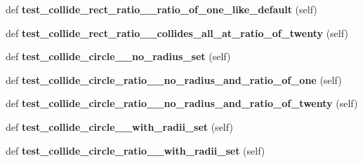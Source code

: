 \begin{DoxyCompactItemize}
\item 
\mbox{\label{classpygame_1_1tests_1_1sprite__test_1_1_sprite_collide_test_abd3014a6db0bb69077bf901b966a7a60}} 
def {\bfseries test\+\_\+collide\+\_\+rect\+\_\+ratio\+\_\+\+\_\+ratio\+\_\+of\+\_\+one\+\_\+like\+\_\+default} (self)
\item 
\mbox{\label{classpygame_1_1tests_1_1sprite__test_1_1_sprite_collide_test_ac09bd157f041a16ff2b6033f659a6550}} 
def {\bfseries test\+\_\+collide\+\_\+rect\+\_\+ratio\+\_\+\+\_\+collides\+\_\+all\+\_\+at\+\_\+ratio\+\_\+of\+\_\+twenty} (self)
\item 
\mbox{\label{classpygame_1_1tests_1_1sprite__test_1_1_sprite_collide_test_a13668e9f41bf73fc7fef0d5b630a4ba4}} 
def {\bfseries test\+\_\+collide\+\_\+circle\+\_\+\+\_\+no\+\_\+radius\+\_\+set} (self)
\item 
\mbox{\label{classpygame_1_1tests_1_1sprite__test_1_1_sprite_collide_test_ae5fd23e423cf103e81c51d75685401f9}} 
def {\bfseries test\+\_\+collide\+\_\+circle\+\_\+ratio\+\_\+\+\_\+no\+\_\+radius\+\_\+and\+\_\+ratio\+\_\+of\+\_\+one} (self)
\item 
\mbox{\label{classpygame_1_1tests_1_1sprite__test_1_1_sprite_collide_test_a4740c32a2b0a0bfcfbabb28485b70191}} 
def {\bfseries test\+\_\+collide\+\_\+circle\+\_\+ratio\+\_\+\+\_\+no\+\_\+radius\+\_\+and\+\_\+ratio\+\_\+of\+\_\+twenty} (self)
\item 
\mbox{\label{classpygame_1_1tests_1_1sprite__test_1_1_sprite_collide_test_af367ee97606ac02762911ae8529be62c}} 
def {\bfseries test\+\_\+collide\+\_\+circle\+\_\+\+\_\+with\+\_\+radii\+\_\+set} (self)
\item 
\mbox{\label{classpygame_1_1tests_1_1sprite__test_1_1_sprite_collide_test_ad6f90fa7cad721de8b27633c30c90815}} 
def {\bfseries test\+\_\+collide\+\_\+circle\+\_\+ratio\+\_\+\+\_\+with\+\_\+radii\+\_\+set} (self)

\end{DoxyCompactItemize}

